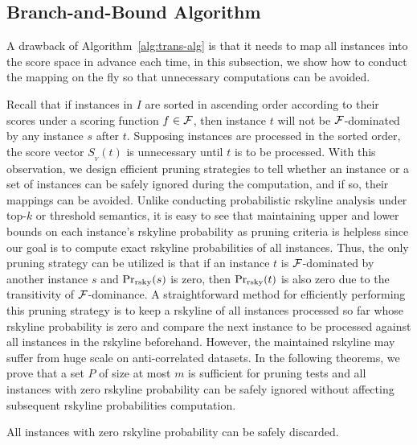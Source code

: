 \subsection{Branch-and-Bound Algorithm}\label{subsec:bb}

A drawback of Algorithm~\ref{alg:trans-alg} is that it needs to map all instances into the score space in advance each time, in this subsection, we show how to conduct the mapping on the fly so that unnecessary computations can be avoided.

Recall that if instances in $I$ are sorted in ascending order according to their scores under a scoring function $f \in \mathcal{F}$, then instance $t$ will not be $\mathcal{F}$-dominated by any instance $s$ after $t$.
Supposing instances are processed in the sorted order, the score vector $S_{_V}(t)$ is unnecessary until $t$ is to be processed.
With this observation, we design efficient pruning strategies to tell whether an instance or a set of instances can be safely ignored during the computation, and if so, their mappings can be avoided.
Unlike conducting probabilistic rskyline analysis under top-$k$ or threshold semantics, it is easy to see that maintaining upper and lower bounds on each instance's rskyline probability as pruning criteria is helpless since our goal is to compute exact rskyline probabilities of all instances.
Thus, the only pruning strategy can be utilized is that if an instance $t$ is $\mathcal{F}$-dominated by another instance $s$ and $\Pr_{\rm rsky}(s)$ is zero, then $\Pr_{\rm rsky}(t)$ is also zero due to the transitivity of $\mathcal{F}$-dominance.
A straightforward method for efficiently performing this pruning strategy is to keep a rskyline of all instances processed so far whose rskyline probability is zero and compare the next instance to be processed against all instances in the rskyline beforehand.
However, the maintained rskyline may suffer from huge scale on anti-correlated datasets.
In the following theorems, we prove that a set $P$ of size at most $m$ is sufficient for pruning tests and all instances with zero rskyline probability can be safely ignored without affecting subsequent rskyline probabilities computation.

\begin{theorem}
	All instances with zero rskyline probability can be safely discarded.
\end{theorem}

